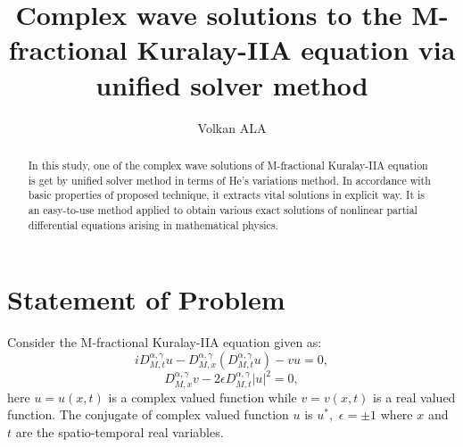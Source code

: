 \documentclass[12pt]{llncs}
\begin{document}
\fi


\title{Complex wave solutions to the M-fractional Kuralay-IIA equation via unified solver method}

\author{Volkan ALA
  }

\maketitle

\begin{abstract}
In this study, one of the complex wave solutions of M-fractional Kuralay-IIA equation is get by unified solver method in terms of  He's variations method. In accordance with basic properties of proposed technique, it extracts vital solutions in explicit way. It is an easy-to-use method applied to obtain various exact solutions of nonlinear partial differential equations arising in mathematical physics.

\end{abstract}
\section{Statement of Problem}


Consider the M-fractional Kuralay-IIA equation given as\cite{Zafar}:%
\begin{equation}
	iD_{M,t}^{\alpha ,\gamma }u- D_{M,x}^{\alpha ,\gamma }\left( D_{M,t}^{\alpha
		,\gamma }u\right) -vu=0,
\end{equation}%
\begin{equation}
	D_{M,x}^{\alpha ,\gamma }v-2\epsilon D_{M,t}^{\alpha ,\gamma }\left
	\vert
	u\right\vert ^{2}=0,
\end{equation}
here $u=u\left( x,t\right) $ is a complex valued function while $v=v\left(
x,t\right) $ is a real valued function. The conjugate of complex valued
function $u$ is $u^{\ast },$ $\epsilon =\pm 1$ where $x$ and $t$ are the
spatio-temporal real variables.
\end{document}
